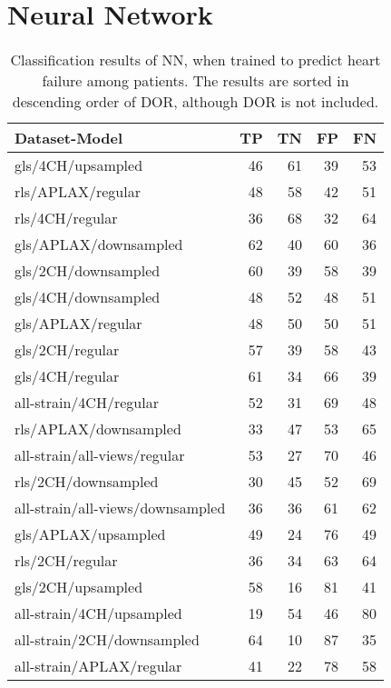 \section{Neural Network}

\begin{longtable}{lrrrr}
    \caption{Classification results of NN, when trained to predict heart failure among patients.
             The results are sorted in descending order of DOR, although DOR is not included.}
    \label{tab:dl_hf_raw_results}\\
    \hline
    Dataset-Model                    & TP & TN & FP & FN \\
    \hline
    gls/4CH/upsampled                & 46 & 61 & 39 & 53 \\
    rls/APLAX/regular                & 48 & 58 & 42 & 51 \\
    rls/4CH/regular                  & 36 & 68 & 32 & 64 \\
    gls/APLAX/downsampled            & 62 & 40 & 60 & 36 \\
    gls/2CH/downsampled              & 60 & 39 & 58 & 39 \\
    gls/4CH/downsampled              & 48 & 52 & 48 & 51 \\
    gls/APLAX/regular                & 48 & 50 & 50 & 51 \\
    gls/2CH/regular                  & 57 & 39 & 58 & 43 \\
    gls/4CH/regular                  & 61 & 34 & 66 & 39 \\
    all-strain/4CH/regular           & 52 & 31 & 69 & 48 \\
    rls/APLAX/downsampled            & 33 & 47 & 53 & 65 \\
    all-strain/all-views/regular     & 53 & 27 & 70 & 46 \\
    rls/2CH/downsampled              & 30 & 45 & 52 & 69 \\
    all-strain/all-views/downsampled & 36 & 36 & 61 & 62 \\
    gls/APLAX/upsampled              & 49 & 24 & 76 & 49 \\
    rls/2CH/regular                  & 36 & 34 & 63 & 64 \\
    gls/2CH/upsampled                & 58 & 16 & 81 & 41 \\
    all-strain/4CH/upsampled         & 19 & 54 & 46 & 80 \\
    all-strain/2CH/downsampled       & 64 & 10 & 87 & 35 \\
    all-strain/APLAX/regular         & 41 & 22 & 78 & 58 \\

\end{longtable}
